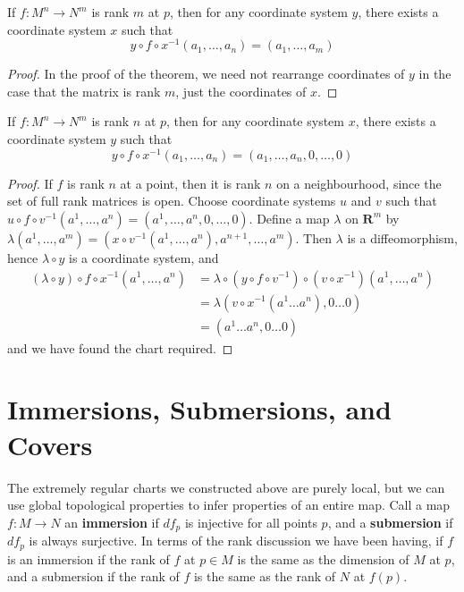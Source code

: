 \begin{corollary}
    If $f: M^n \to N^m$ is rank $m$ at $p$, then for any coordinate system $y$, there exists a coordinate system $x$ such that
    \[ y \circ f \circ x^{-1} (a_1, \dots, a_n) = (a_1, \dots, a_m) \]
\end{corollary}
\begin{proof}
    In the proof of the theorem, we need not rearrange coordinates of $y$ in the case that the matrix is rank $m$, just the coordinates of $x$.
\end{proof}

\begin{corollary}
    If $f: M^n \to N^m$ is rank $n$ at $p$, then for any coordinate system $x$, there exists a coordinate system $y$ such that
    \[ y \circ f \circ x^{-1} (a_1, \dots, a_n) = (a_1, \dots, a_n, 0, \dots, 0) \]
\end{corollary}
\begin{proof}
    If $f$ is rank $n$ at a point, then it is rank $n$ on a neighbourhood, since the set of full rank matrices is open. Choose coordinate systems $u$ and $v$ such that $u \circ f \circ v^{-1}(a^1, \dots, a^n) = (a^1, \dots, a^n, 0, \dots, 0)$. Define a map $\lambda$ on $\mathbf{R}^m$ by $\lambda(a^1, \dots, a^m) = (x \circ v^{-1}(a^1, \dots, a^n), a^{n+1}, \dots, a^m)$. Then $\lambda$ is a diffeomorphism, hence $\lambda \circ y$ is a coordinate system, and
    \begin{align*}
        (\lambda \circ y) \circ f \circ x^{-1} (a^1, \dots, a^n) &= \lambda \circ (y \circ f \circ v^{-1}) \circ (v \circ x^{-1}) (a^1, \dots, a^n)\\
        &= \lambda (v \circ x^{-1} (a^1 \dots a^n), 0 \dots 0)\\
        &= (a^1 \dots a^n, 0 \dots 0)
    \end{align*}
    and we have found the chart required.
\end{proof}

\section{Immersions, Submersions, and Covers}

The extremely regular charts we constructed above are purely local, but we can use global topological properties to infer properties of an entire map. Call a map $f:M \to N$ an {\bf immersion} if $df_p$ is injective for all points $p$, and a {\bf submersion} if $df_p$ is always surjective. In terms of the rank discussion we have been having, if $f$ is an immersion if the rank of $f$ at $p \in M$ is the same as the dimension of $M$ at $p$, and a submersion if the rank of $f$ is the same as the rank of $N$ at $f(p)$.

